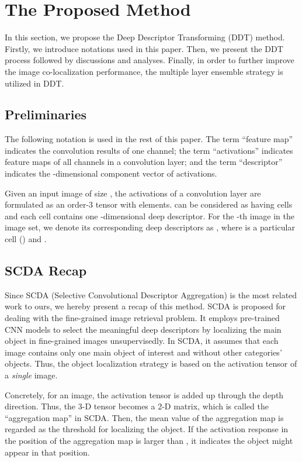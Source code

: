 \documentclass[twocolumn]{svjour3}          \smartqed  \usepackage{graphicx}
\begin{document}
\section{The Proposed Method}\label{sec:ourddt}

In this section, we propose the Deep Descriptor Transforming (DDT) method. Firstly, we introduce notations used in this paper. Then, we present the DDT process followed by discussions and analyses. Finally, in order to further improve the image co-localization performance, the multiple layer ensemble strategy is utilized in DDT.

\subsection{Preliminaries}

The following notation is used in the rest of this paper. The term ``feature map'' indicates the convolution results of one channel; the term ``activations'' indicates feature maps of all channels in a convolution layer; and the term ``descriptor'' indicates the -dimensional component vector of activations.

Given an input image  of size , the activations of a convolution layer are formulated as an order-3 tensor  with  elements.  can be considered as having  cells and each cell contains one -dimensional deep descriptor. For the -th image in the image set, we denote its corresponding deep descriptors as , where  is a particular cell () and .

\subsection{SCDA Recap}\label{sec:scda}

Since SCDA (Selective Convolutional Descriptor Aggregation) \citep{scda2016} is the most related work to ours, we hereby present a recap of this method. SCDA is proposed for dealing with the fine-grained image retrieval problem. It employs pre-trained CNN models to select the meaningful deep descriptors by localizing the main object in fine-grained images unsupervisedly. In SCDA, it assumes that each image contains only one main object of interest and without other categories' objects. Thus, the object localization strategy is based on the activation tensor of a \emph{single} image.

Concretely, for an image, the activation tensor is added up through the depth direction. Thus, the  3-D tensor becomes a  2-D matrix, which is called the ``aggregation map'' in SCDA. Then, the mean value  of the aggregation map is regarded as the threshold for localizing the object. If the activation response in the position  of the aggregation map is larger than , it indicates the object might appear in that position.
\end{document}
